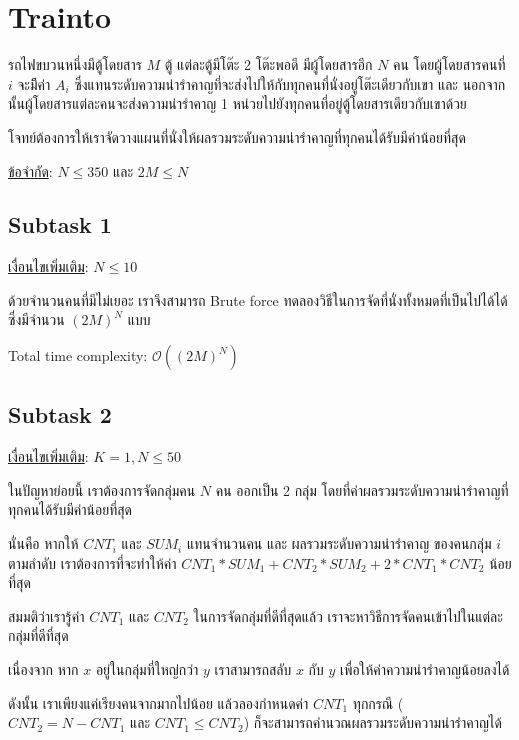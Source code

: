 \documentclass[12pt]{article}
\begin{document}
\section{Trainto}

รถไฟขบวนหนึ่งมีตู้โดยสาร $M$ ตู้ แต่ละตู้มีโต๊ะ 2 โต๊ะพอดี มีผู้โดยสารอีก $N$ คน โดยผู้โดยสารคนที่ $i$ จะมีึค่า $A_i$ ซึ่งแทนระดับความน่ารำคาญที่จะส่งไปให้กับทุกคนที่นั่งอยู่โต๊ะเดียวกับเขา และ นอกจากนั้นผู้โดยสารแต่ละคนจะส่งความน่ารำคาญ 1 หน่วยไปยังทุกคนที่อยู่ตู้โดยสารเดียวกับเขาด้วย 

โจทย์ต้องการให้เราจัดวางแผนที่นั่งให้ผลรวมระดับความน่ารำคาญที่ทุกคนได้รับมีค่าน้อยที่สุด

\underline{ข้อจำกัด}: $N \leq 350$ และ $2M \leq N$

\subsection{Subtask 1}

\underline{เงื่อนไขเพิ่มเติม}: $N \leq 10$

ด้วยจำนวนคนที่มีไม่เยอะ เราจึงสามารถ Brute force ทดลองวิธีในการจัดที่นั่งทั้งหมดที่เป็นไปได้ได้ ซึ่งมีจำนวน $(2M)^N$ แบบ

Total time complexity: $\mathcal{O}((2M)^N)$

\subsection{Subtask 2}

\underline{เงื่อนไขเพิ่มเติม}: $K = 1, N \leq 50$

ในปัญหาย่อยนี้ เราต้องการจัดกลุ่มคน $N$ คน ออกเป็น 2 กลุ่ม โดยที่ค่าผลรวมระดับความน่ารำคาญที่ทุกคนได้รับมีค่าน้อยที่สุด

นั่นคือ หากให้ $CNT_i$ และ $SUM_i$ แทนจำนวนคน และ ผลรวมระดับความน่ารำคาญ ของคนกลุ่ม $i$ ตามลำดับ เราต้องการที่จะทำให้ค่า $CNT_1 * SUM_1 + CNT_2 * SUM_2 + 2 * CNT_1 * CNT_2$ น้อยที่สุด

สมมติว่าเรารู้ค่า $CNT_1$ และ $CNT_2$ ในการจัดกลุ่มที่ดีที่สุดแล้ว เราจะหาวิธีการจัดคนเข้าไปในแต่ละกลุ่มที่ดีที่สุด


เนื่องจาก หาก $x$ อยู่ในกลุ่มที่ใหญ่กว่า $y$ เราสามารถสลับ $x$ กับ $y$ เพื่อให้ค่าความน่ารำคาญน้อยลงได้

ดังนั้น เราเพียงแค่เรียงคนจากมากไปน้อย แล้วลองกำหนดค่า $CNT_1$ ทุกกรณี ($CNT_2 = N-CNT_1$ และ $CNT_1 \leq CNT_2$) ก็จะสามารถคำนวณผลรวมระดับความน่ารำคาญได้
\end{document}

